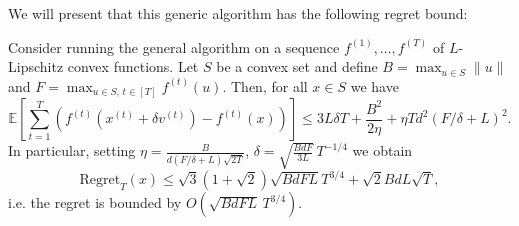 We will present that this generic algorithm has the following regret bound:
\begin{theorem}\label{thm:bandit_general_regret}
Consider running the general algorithm on a
sequence $f^{(1)}, \ldots, f^{(T)}$ of $L$-Lipschitz convex functions. Let $S$ be a
convex set and define $B = \max_{u \in S} \|u\|$ and
$F = \max_{u \in S,\, t \in [T]} f^{(t)}(u)$. Then, for all $x \in S$ we have
$$
\mathbb{E}\left[\sum_{t=1}^T \left(f^{(t)}(x^{(t)} + \delta v^{(t)}) - f^{(t)}(x)\right)\right]
\leq 3L\delta T + \frac{B^2}{2\eta} + \eta T d^2 (F/\delta + L)^2.
$$
In particular, setting $\eta = \frac{B}{d(F/\delta + L)\sqrt{2T}}$,
$\delta = \sqrt{\frac{BdF}{3L}}\, T^{-1/4}$ we obtain
$$
\text{Regret}_T(x) \leq \sqrt{3}(1+\sqrt{2})\sqrt{BdFL}T^{3/4} + \sqrt{2}BdL\sqrt{T},
$$
i.e. the regret is bounded by $O\left(\sqrt{BdFL}\, T^{3/4}\right)$.
\end{theorem}

